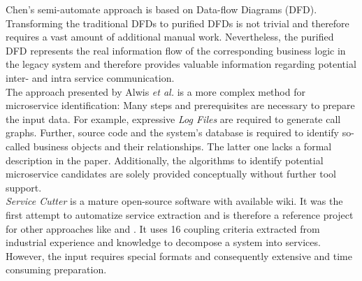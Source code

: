 \noindent
Chen's semi-automate approach \cite{DataflowDrivenChen} is based on Data-flow Diagrams (DFD). Transforming the traditional DFDs to purified DFDs is not trivial and therefore requires a vast amount of additional manual work. Nevertheless, the purified DFD represents the real information flow of the corresponding business logic in the legacy system and therefore provides valuable information regarding potential inter- and intra service communication. \\

\noindent
The approach presented by Alwis \textit{et al.} \cite{HeuristicsAlwis} is a more complex method for microservice identification: Many steps and 
prerequisites are necessary to prepare the input data. For example, expressive \textit{Log Files} are required to generate call graphs. Further, source code and the system's database is required to identify so-called business objects and their relationships. The latter one lacks a formal description in the paper. 
Additionally, the algorithms to identify potential microservice candidates are solely provided conceptually without further tool support. \\

\noindent
\textit{Service Cutter} \cite{ServiceCutter} is a mature open-source software with available wiki. It was the first attempt to automatize service extraction and is therefore a reference project for other approaches like \cite{ExtractionMazlami} and \cite{DataflowDrivenChen}. It uses 16 coupling criteria extracted from industrial experience and knowledge to decompose a system into services. However, the input requires special formats and consequently extensive and time consuming preparation.








